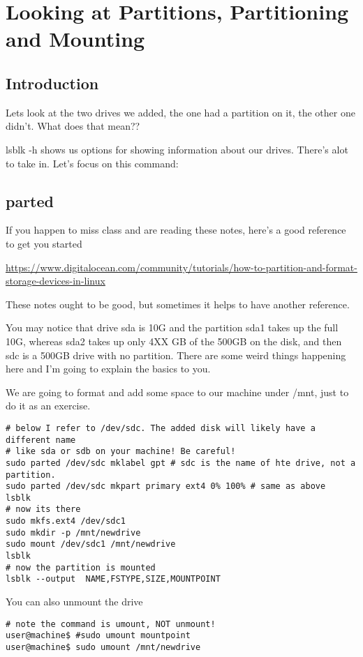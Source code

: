 \documentclass[10pt]{article}
\begin{document}
\section{Looking at Partitions, Partitioning and Mounting}

\subsection{Introduction}

Lets look at the two drives we added, the one had a partition on it, the other
one didn't. What does that mean??

lsblk -h shows us options for showing information about our drives. There's alot
to take in. Let's focus on this command:


\subsection{parted}

If you happen to miss class and are reading these notes, here's a good reference
to get you started

\url{https://www.digitalocean.com/community/tutorials/how-to-partition-and-format-storage-devices-in-linux}

These notes ought to be good, but sometimes it helps to have another reference.

You may notice that drive sda is 10G and the partition sda1 takes up the full
10G, whereas sda2 takes up only 4XX GB of the 500GB on the disk, and then sdc is
a 500GB drive with no partition. There are some weird things happening here and
I'm going to explain the basics to you.

We are going to format and add some space to our machine under /mnt, just to do
it as an exercise.

\begin{lstlisting}
# below I refer to /dev/sdc. The added disk will likely have a different name
# like sda or sdb on your machine! Be careful!
sudo parted /dev/sdc mklabel gpt # sdc is the name of hte drive, not a
partition.
sudo parted /dev/sdc mkpart primary ext4 0% 100% # same as above
lsblk
# now its there
sudo mkfs.ext4 /dev/sdc1
sudo mkdir -p /mnt/newdrive
sudo mount /dev/sdc1 /mnt/newdrive
lsblk
# now the partition is mounted
lsblk --output  NAME,FSTYPE,SIZE,MOUNTPOINT
\end{lstlisting} 

You can also unmount the drive

\begin{lstlisting}
# note the command is umount, NOT unmount!
user@machine$ #sudo umount mountpoint
user@machine$ sudo umount /mnt/newdrive
\end{lstlisting}
\end{document}
